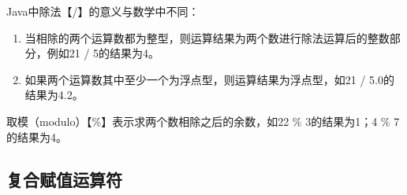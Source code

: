 Java中除法【/】的意义与数学中不同：

\begin{enumerate}
	\item 当相除的两个运算数都为整型，则运算结果为两个数进行除法运算后的整数部分，例如21 / 5的结果为4。

	\item 如果两个运算数其中至少一个为浮点型，则运算结果为浮点型，如21 / 5.0的结果为4.2。
\end{enumerate}

取模（modulo）【\%】表示求两个数相除之后的余数，如22 \% 3的结果为1；4 \% 7的结果为4。

\subsection{复合赋值运算符}

\begin{table}[H]
	\centering
	\caption{复合赋值运算符}
\end{table}

\newpage